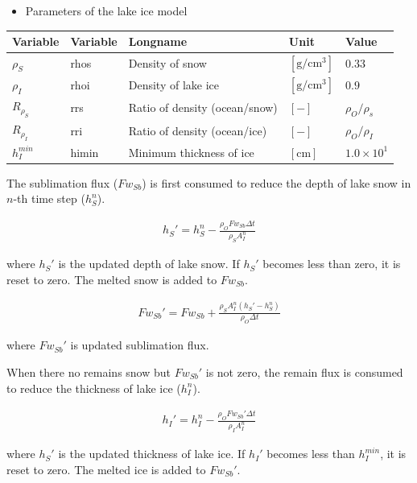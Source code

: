\begin{itemize}
\tightlist
\item
  Parameters of the lake ice model
\end{itemize}

\begin{longtable}[]{@{}lllll@{}}
\toprule
Variable & Variable & Longname & Unit & Value \\
\midrule
\endhead
\(\rho_S\) & rhos & Density of snow & \(\mathrm{[g/cm^3]}\) & \(0.33\) \\
\(\rho_I\) & rhoi & Density of lake ice & \(\mathrm{[g/cm^3]}\) & \(0.9\) \\
\(R_{\rho_S}\) & rrs & Ratio of density (ocean/snow) & \(\mathrm{[-]}\) & \(\rho_O/\rho_s\) \\
\(R_{\rho_I}\) & rri & Ratio of density (ocean/ice) & \(\mathrm{[-]}\) & \(\rho_O/\rho_I\) \\
\(h_I^{min}\) & himin & Minimum thickness of ice & \(\mathrm{[cm]}\) & \(1.0\times 10^1\) \\
\bottomrule
\end{longtable}

The sublimation flux (\(Fw_{Sb}\)) is first consumed to reduce the depth of lake snow in \(n\)-th time step (\(h_S^n\)).

\begin{eqnarray}
    h_S' = h_S^n -  \frac{\rho_O  Fw_{Sb}\Delta t}{\rho_S A_I^n}
\end{eqnarray}

where \(h_S'\) is the updated depth of lake snow. If \(h_S'\) becomes less than zero, it is reset to zero. The melted snow is added to \(Fw_{Sb}\).

\begin{eqnarray}
    Fw_{Sb}' = Fw_{Sb} + \frac{\rho_S A_I^n (h_S' - h_S^n)}{\rho_O\Delta t}
\end{eqnarray}

where \(Fw_{Sb}'\) is updated sublimation flux.

When there no remains snow but \(Fw_{Sb}'\) is not zero, the remain flux is consumed to reduce the thickness of lake ice (\(h_I^n\)).

\begin{eqnarray}
    h_I' = h_I^n - \frac{\rho_O Fw_{Sb}' \Delta t }{\rho_I A_I^n}
\end{eqnarray}

where \(h_S'\) is the updated thickness of lake ice. If \(h_I'\) becomes less than \(h_I^{min}\), it is reset to zero. The melted ice is added to \(Fw_{Sb}'\).


